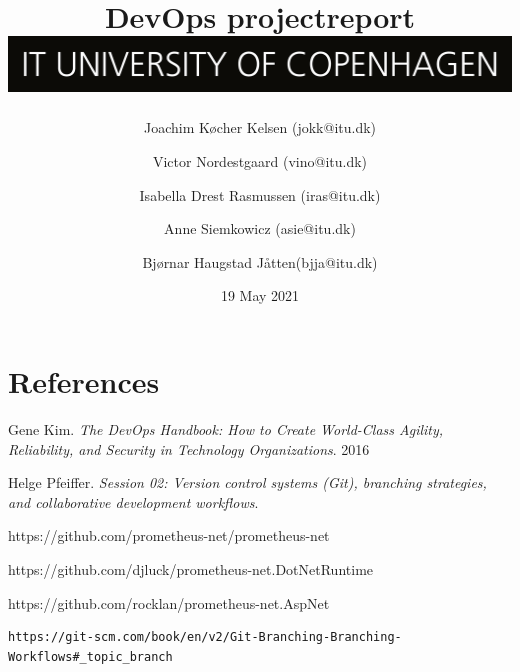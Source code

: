 \documentclass{article}
\title{DevOps projectreport \\[2ex] \includegraphics[scale=0.1]{images/ITU_logo_UK.jpg}}
\author{Joachim Køcher Kelsen (jokk@itu.dk) \and Victor Nordestgaard (vino@itu.dk) \and Isabella Drest Rasmussen (iras@itu.dk) \and Anne Siemkowicz (asie@itu.dk) \and Bjørnar Haugstad Jåtten(bjja@itu.dk)}
\date{19 May 2021}
\begin{document}
{}

\maketitle

\newpage

\tableofcontents

\newpage



\newpage



\newpage



\newpage



\newpage

\section{References}

\begin{thebibliography}{9}
Gene Kim.
\textit{The DevOps Handbook: How to Create World-Class Agility, Reliability, and Security in Technology Organizations}. 
2016

Helge Pfeiffer. 
\textit{Session 02: Version control systems (Git), branching strategies, and collaborative development workflows}. 

https://github.com/prometheus-net/prometheus-net

https://github.com/djluck/prometheus-net.DotNetRuntime

https://github.com/rocklan/prometheus-net.AspNet

\begin{verbatim}
https://git-scm.com/book/en/v2/Git-Branching-Branching-Workflows#_topic_branch
\end{verbatim}

\end{thebibliography}

\newpage
\end{document}
